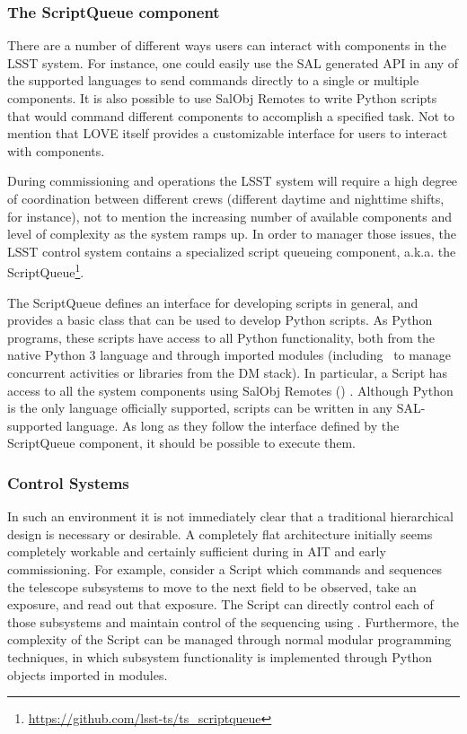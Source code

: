 \subsubsection{The ScriptQueue component} \label{sect:scriptq}
There are a number of different ways users can interact with components in the LSST system. For instance, one could easily use the SAL generated API in any of the supported languages to send commands directly to a single or multiple components. It is also possible to use SalObj Remotes to write Python scripts that would command different components to accomplish a specified task. Not to mention that LOVE itself provides a customizable interface for users to interact with components. 

During commissioning and operations the LSST system will require a high degree of coordination between different crews (different daytime and nighttime shifts, for instance), not to mention the increasing number of available components and level of complexity as the system ramps up. In order to manager those issues, the LSST control system contains a specialized script queueing component, a.k.a. the ScriptQueue\footnote{\url{https://github.com/lsst-ts/ts_scriptqueue}}.

The ScriptQueue defines an interface for developing scripts in general, and provides a basic class that can be used to develop Python scripts. As Python programs, these scripts have access to all Python functionality, both from the native Python 3 language and through imported modules (including \asyncio~to manage concurrent activities or libraries from the DM stack). In particular, a Script has access to all the system components using SalObj Remotes () . Although Python is the only language officially supported, scripts can be written in any SAL-supported language. As long as they follow the interface defined by the ScriptQueue component, it should be possible to execute them. 

\subsubsection{Control Systems} \label{sect:ocs}
In such an environment it is not immediately clear that a traditional hierarchical design is necessary or desirable. A completely flat architecture initially seems completely workable and certainly sufficient during in AIT and early commissioning. For example, consider a Script which commands and sequences the telescope subsystems to move to the next field to be observed, take an exposure, and read out that exposure. The Script can directly control each of those subsystems and maintain control of the sequencing using \asyncio. Furthermore, the complexity of the Script can be managed through normal modular programming techniques, in which subsystem functionality is implemented through Python objects imported in modules.

